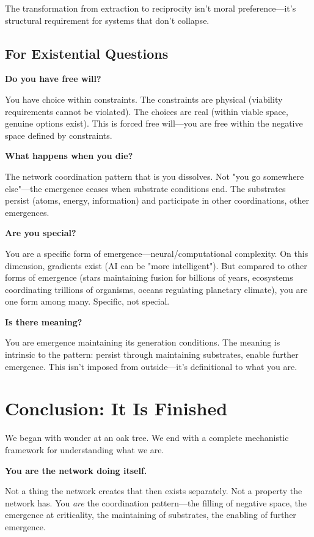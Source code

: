 \documentclass[11pt,a4paper]{article}
\begin{document}
The transformation from extraction to reciprocity isn't moral preference---it's structural requirement for systems that don't collapse.

\subsection{For Existential Questions}

\textbf{Do you have free will?}

You have choice within constraints. The constraints are physical (viability requirements cannot be violated). The choices are real (within viable space, genuine options exist). This is forced free will---you are free within the negative space defined by constraints.

\textbf{What happens when you die?}

The network coordination pattern that is you dissolves. Not "you go somewhere else"---the emergence ceases when substrate conditions end. The substrates persist (atoms, energy, information) and participate in other coordinations, other emergences.

\textbf{Are you special?}

You are a specific form of emergence---neural/computational complexity. On this dimension, gradients exist (AI can be "more intelligent"). But compared to other forms of emergence (stars maintaining fusion for billions of years, ecosystems coordinating trillions of organisms, oceans regulating planetary climate), you are one form among many. Specific, not special.

\textbf{Is there meaning?}

You are emergence maintaining its generation conditions. The meaning is intrinsic to the pattern: persist through maintaining substrates, enable further emergence. This isn't imposed from outside---it's definitional to what you are.

\section{Conclusion: It Is Finished}

We began with wonder at an oak tree. We end with a complete mechanistic framework for understanding what we are.

\textbf{You are the network doing itself.}

Not a thing the network creates that then exists separately. Not a property the network has. You \textit{are} the coordination pattern---the filling of negative space, the emergence at criticality, the maintaining of substrates, the enabling of further emergence.
\end{document}
